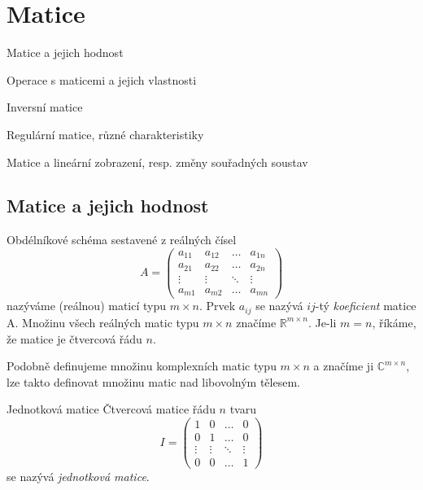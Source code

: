 \def\rank{\mathrm{rank}}
\def\Ker{\mathrm{Ker\ }}
\def\dim{\mathrm{dim}}

\section{Matice}

\begin{pozadavky}
\begin{pitemize}
	\item Matice a jejich hodnost
	\item Operace s maticemi a jejich vlastnosti
	\item Inversní matice
	\item Regulární matice, různé charakteristiky
	\item Matice a lineární zobrazení, resp. změny souřadných soustav
\end{pitemize}
\end{pozadavky}

\subsection{Matice a jejich hodnost} 

\begin{definice}
Obdélníkové schéma sestavené z reálných čísel
$$A=\left( \begin{array}{cccc} a_{11} & a_{12} & \dots & a_{1n} \\ a_{21} & a_{22} & \dots & a_{2n} \\ \vdots & \vdots & \ddots & \vdots \\ a_{m1} & a_{m2} & \dots & a_{mn} \end{array} \right)$$
nazýváme (reálnou) maticí typu $m \times n$. Prvek $a_{ij}$ se nazývá $ij$-tý \emph{koeficient} matice A. Množinu všech reálných matic typu  $m \times n$ značíme $\mathbb{R}^{m \times n}$. Je-li $m=n$, říkáme, že matice je čtvercová řádu $n$.

Podobně definujeme množinu komplexních matic typu $m \times n$ a značíme ji $\mathbb{C}^{m \times n}$, lze takto definovat množinu matic nad libovolným tělesem.
\end{definice}

\begin{definiceN}{Jednotková matice}
Čtvercová matice řádu $n$ tvaru 
$$I=\left( \begin{array}{cccc} 1 & 0 & \dots & 0 \\ 0 & 1 & \dots & 0 \\ \vdots & \vdots & \ddots & \vdots \\ 0 & 0 & \dots & 1 \end{array} \right)$$
se nazývá \emph{jednotková matice}.
\end{definiceN}

